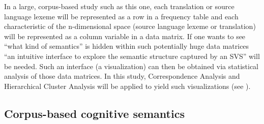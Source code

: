 In a large, corpus-based study such as this one, each translation or source language lexeme will be represented as a row in a frequency table and each characteristic of the n-dimensional space (source language lexeme or translation) will be represented as a column variable in a data matrix. If one wants to see “what kind of semantics” \citep[17]{heylen_looking_2012} is hidden within such potentially huge data matrices “an intuitive interface to explore the semantic structure captured by an SVS” \citep[17]{heylen_looking_2012} will be needed. Such an interface (a visualization) can then be obtained via statistical analysis of those data matrices. In this study, Correspondence Analysis and Hierarchical Cluster Analysis will be applied to yield such visualizations (see ).

\subsection{Corpus-based cognitive semantics}
\label{sec:2.4.3}  
